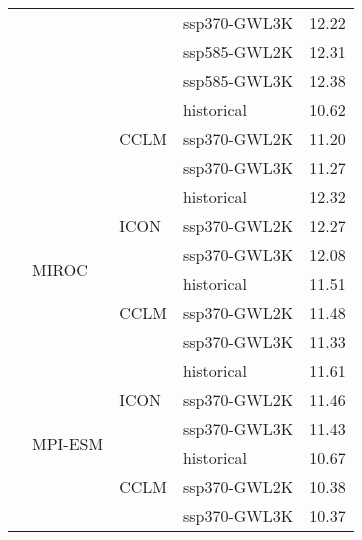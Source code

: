 \begin{table}[!htbp]
\begin{tabular}{lll|l|c}
 &  &  & ssp370-GWL3K & 12.22 \\
 &  &  & ssp585-GWL2K & 12.31 \\
 &  &  & ssp585-GWL3K & 12.38 \\
\cmidrule(lr){3-5}
 &  & \multirow{3}{*}{CCLM} & historical & 10.62 \\
 &  &  & ssp370-GWL2K & 11.20 \\
 &  &  & ssp370-GWL3K & 11.27 \\
\cmidrule(lr){3-5}
\cmidrule(lr){2-5}
 & \multirow{6}{*}{MIROC} & \multirow{3}{*}{ICON} & historical & 12.32 \\
 &  &  & ssp370-GWL2K & 12.27 \\
 &  &  & ssp370-GWL3K & 12.08 \\
\cmidrule(lr){3-5}
 &  & \multirow{3}{*}{CCLM} & historical & 11.51 \\
 &  &  & ssp370-GWL2K & 11.48 \\
 &  &  & ssp370-GWL3K & 11.33 \\
\cmidrule(lr){3-5}
\cmidrule(lr){2-5}
 & \multirow{6}{*}{MPI-ESM} & \multirow{3}{*}{ICON} & historical & 11.61 \\
 &  &  & ssp370-GWL2K & 11.46 \\
 &  &  & ssp370-GWL3K & 11.43 \\
\cmidrule(lr){3-5}
 &  & \multirow{3}{*}{CCLM} & historical & 10.67 \\
 &  &  & ssp370-GWL2K & 10.38 \\
 &  &  & ssp370-GWL3K & 10.37 \\
\bottomrule
\end{tabular}
\end{table}
